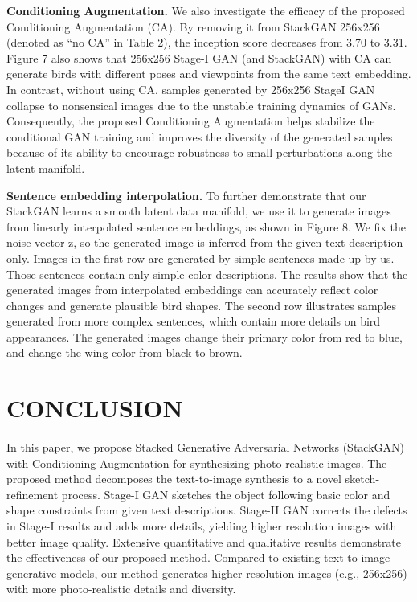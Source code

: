 \documentclass[a4paper,12pt,oneside]{article}
\begin{document}
\textbf{Conditioning Augmentation. }We also investigate the efficacy of the proposed Conditioning Augmentation (CA). By removing it from StackGAN 256x256 (denoted as “no CA” in Table 2), the inception score decreases from 3.70 to 3.31. Figure 7 also shows that 256x256 Stage-I GAN (and StackGAN) with CA can generate birds with different poses and viewpoints from the same text embedding. In contrast, without using CA, samples generated by 256x256 StageI GAN collapse to nonsensical images due to the unstable training dynamics of GANs. Consequently, the proposed Conditioning Augmentation helps stabilize the conditional GAN training and improves the diversity of the generated samples because of its ability to encourage robustness to small perturbations along the latent manifold. 

\textbf{Sentence embedding interpolation. }To further demonstrate that our StackGAN learns a smooth latent data manifold, we use it to generate images from linearly interpolated sentence embeddings, as shown in Figure 8. We fix the noise vector z, so the generated image is inferred from the given text description only. Images in the first row are generated by simple sentences made up by us. Those sentences contain only simple color descriptions. The results show that the generated images from interpolated embeddings can accurately reflect color changes and generate plausible bird shapes. The second row illustrates samples generated from more complex sentences, which contain more details on bird appearances. The generated images change their primary color from red to blue, and change the wing color from black to brown. 

\newpage
\section{CONCLUSION}
\paragraph{}
In this paper, we propose Stacked Generative Adversarial Networks (StackGAN) with Conditioning Augmentation for synthesizing photo-realistic images. The proposed method decomposes the text-to-image synthesis to a novel sketch-refinement process. Stage-I GAN sketches the object following basic color and shape constraints from given text descriptions. Stage-II GAN corrects the defects in Stage-I results and adds more details, yielding higher resolution images with better image quality. Extensive quantitative and qualitative results demonstrate the effectiveness of our proposed method. Compared to existing text-to-image generative models, our method generates higher resolution images (e.g., 256x256) with more photo-realistic details and diversity. 
\end{document}
